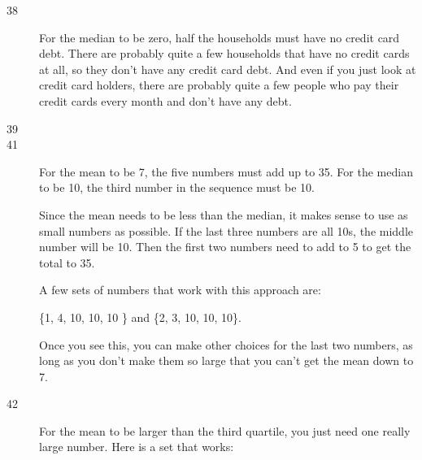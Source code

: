\documentclass[letterpaper, landscape]{exam}
\begin{document}
\begin{description}
      \item[38]
        For the median to be zero, half the households must have no credit card
        debt.  There are probably quite a few households that have no credit
        cards at all, so they don't have any credit card debt.  And even if you
        just look at credit card holders, there are probably quite a few people
        who pay their credit cards every month and don't have any debt.

      \item[39]

      \item[41]
        For the mean to be 7, the five numbers must add up to 35.  For the
        median to be 10, the third number in the sequence must be 10.

        Since the mean needs to be less than the median, it makes sense to use
        as small numbers as possible.  If the last three numbers are all 10s,
        the middle number will be 10.  Then the first two numbers need to add
        to 5 to get the total to 35.

        A few sets of numbers that work with this approach are: 
        
        \{1, 4, 10, 10, 10 \} and \{2, 3, 10, 10, 10\}.

        Once you see this, you can make other choices for the last two numbers,
        as long as you don't make them so large that you can't get the mean
        down to 7.  

      \pagebreak

      \item[42]
        For the mean to be larger than the third quartile, you just need one
        really large number.  Here is a set that works: 
        

\end{description}
\end{document}
